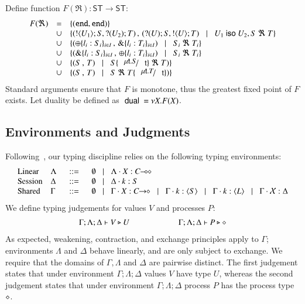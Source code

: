 %
\begin{definition}[Duality]\rm
	Define function $F(\Re): \mathsf{ST} \longrightarrow \mathsf{ST}$:
	\[
		\begin{array}{rcl}
			F(\Re) 	&=&	\set{(\tinact, \tinact)}\\
				&\cup&	\set{(\btout{U_1} S, \btinp{U_2} T)\,,\, (\btinp{U} S, \btout{U} T) \bnfbar U_1 \iso U_2, S\ \Re\ T}\\
				&\cup&	\set{(\btsel{l_i: S_i}_{i \in I} \,,\, \btbra{l_i: T_i}_{i \in I}) \bnfbar  S_i\ \Re\ T_i}\\
				&\cup&	\set{(\btbra{l_i: S_i}_{i \in I}\,,\, \btsel{l_i: T_i}_{i \in I}) \bnfbar S_i\ \Re\ T_i}\\
				&\cup&	\set{(S\,,\, T) \bnfbar S\subst{\trec{t}{S}}{\vart{t}}\ \Re\ T)}\\
				&\cup&	\set{(S\,,\, T) \bnfbar S\ \Re\ T\subst{\trec{t}{T}}{\vart{t}})}
		\end{array}
	\]	
	\noi Standard arguments ensure that $F$ is monotone, thus the greatest fixed point
	of $F$ exists. Let duality be defined as $\ \mathsf{dual}\  = \nu X. F(X)$.
\end{definition}
%



\subsection{Environments and Judgments}
%
Following~\cite{tlca07}, 
our typing discipline relies on the following typing environments: %
\[
\begin{array}{llcl}
	\text{Linear}	& \Lambda & \bnfis &	\emptyset \bnfbar \Lambda \cat \varp{X}: \lhot{C}\\
	\text{Session}	& \Delta  & \bnfis &	\emptyset \bnfbar \Delta \cat k:S \\
	\text{Shared}	& \Gamma  & \bnfis &	\emptyset \bnfbar \Gamma \cat \varp{X}: \shot{C} \bnfbar \Gamma \cat k: \chtype{S} \bnfbar
						\Gamma \cat k: \chtype{L} \bnfbar \Gamma \cat \rvar{X}: \Delta
\end{array}
\]
%
\noi We define typing judgements for values $V$
and processes $P$:
%
\[	\begin{array}{c}
		\Gamma; \Lambda; \Delta \vdash V \triangleright U \qquad \qquad \qquad \Gamma; \Lambda; \Delta \vdash P \triangleright \diamond
	\end{array}
\]
%
\noi As expected, weakening, contraction, and exchange principles apply to $\Gamma$;
environments $\Lambda$ and $\Delta$ behave linearly, and are only subject to exchange.
We require that the domains of $\Gamma, \Lambda$ and $\Delta$ are pairwise distinct.
The first judgement states that under environment $\Gamma; \Lambda; \Delta$
values $V$ have type $U$,
whereas the second judgement states that under environment $\Gamma; \Lambda; \Delta$
process $P$ has the process type $\diamond$.

